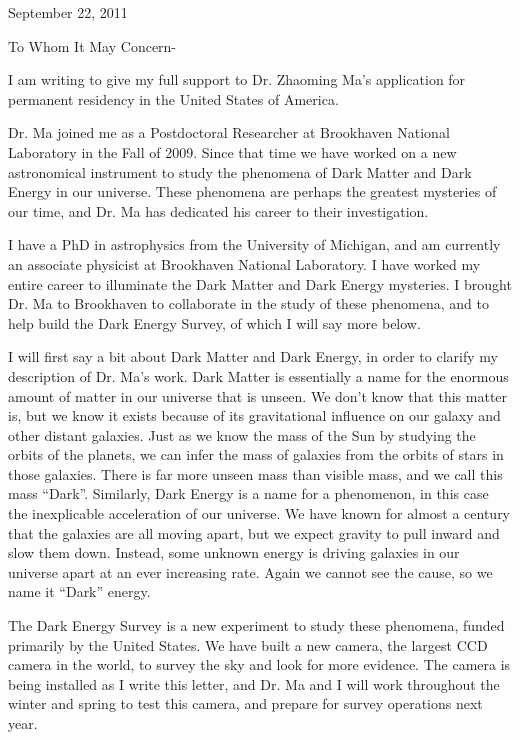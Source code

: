 \documentclass[12pt]{letter}
\begin{document}
\hfill September 22,  2011
\newline

To Whom It May Concern-

I am writing to give my full support to Dr. Zhaoming Ma's application for
permanent residency in the United States of America.

Dr. Ma joined me as a Postdoctoral Researcher at Brookhaven National Laboratory
in the Fall of 2009.  Since that time we have worked on a new astronomical
instrument to study the phenomena of Dark Matter and Dark Energy in our
universe.  These phenomena are perhaps the greatest mysteries of our time, and
Dr. Ma has dedicated his career to their investigation.

I have a PhD in astrophysics from the University of Michigan, and am currently
an associate physicist at Brookhaven National Laboratory.  I have worked my
entire career to illuminate the Dark Matter and Dark Energy mysteries.  I
brought Dr. Ma to Brookhaven to collaborate in the study of these phenomena,
and to help build the Dark Energy Survey, of which I will say more below.

I will first say a bit about Dark Matter and Dark Energy, in order to clarify
my description of Dr. Ma's work.  Dark Matter is essentially a name for the
enormous amount of matter in our universe that is unseen.  We don't know that
this matter is, but we know it exists because of its gravitational influence on
our galaxy and other distant galaxies.  Just as we know the mass of the Sun by
studying the orbits of the planets, we can infer the mass of galaxies from the
orbits of stars in those galaxies.  There is far more unseen mass than visible
mass, and we call this mass ``Dark''.  Similarly, Dark Energy is a name for a
phenomenon, in this case the inexplicable acceleration of our universe. We have
known for almost a century that the galaxies are all moving apart, but we
expect gravity to pull inward and slow them down.  Instead, some unknown energy
is driving galaxies in our universe apart at an ever increasing rate.  Again
we cannot see the cause, so we name it ``Dark'' energy.

The Dark Energy Survey is a new experiment to study these phenomena, funded
primarily by the United States.  We have built a new camera, the largest CCD
camera in the world, to survey the sky and look for more evidence.  The camera
is being installed as I write this letter, and Dr. Ma and I will work
throughout the winter and spring to test this camera, and prepare for survey
operations next year.
\end{document}
